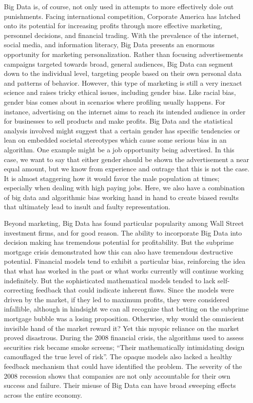 \documentclass[sigconf]{acmart}
\begin{document}
Big Data is, of course, not only used in attempts to more effectively dole out punishments. Facing international competition, Corporate America has latched onto its potential for increasing profits through more effective marketing, personnel decisions, and financial trading. With the prevalence of the internet, social media, and information literacy, Big Data presents an enormous opportunity for marketing personalization. Rather than focusing advertisements campaigns targeted towards broad, general audiences, Big Data can segment down to the individual level, targeting people based on their own personal data and patterns of behavior. However, this type of marketing is still a very inexact science and raises tricky ethical issues, including gender bias. Like racial bias, gender bias comes about in scenarios where profiling usually happens. For instance, advertising on the internet aims to reach its intended audience in order for businesses to sell products and make profits. Big Data and the statistical analysis involved might suggest that a certain gender has specific tendencies or lean on embedded societal stereotypes which cause some serious bias in an algorithm. One example might be a job opportunity being advertised. In this case, we want to say that either gender should be shown the advertisement a near equal amount, but we know from experience and outrage that this is not the case. It is almost staggering how it would favor the male population at times; especially when dealing with high paying jobs. Here, we also have a combination of big data and algorithmic bias working hand in hand to create biased results that ultimately lead to insult and faulty representation\cite{Brown2017}.

	Beyond marketing, Big Data has found particular popularity among Wall Street investment firms, and for good reason. The ability to incorporate Big Data into decision making has tremendous potential for profitability. But the subprime mortgage crisis demonstrated how this can also have tremendous destructive potential. Financial models tend to exhibit a particular bias, reinforcing the idea that what has worked in the past or what works currently will continue working indefinitely. But the sophisticated mathematical models tended to lack self-correcting feedback that could indicate inherent flaws. Since the models were driven by the market, if they led to maximum profits, they were considered infallible, although in hindsight we can all recognize that betting on the subprime mortgage bubble was a losing proposition. Otherwise, why would the omniscient invisible hand of the market reward it? Yet this myopic reliance on the market proved disastrous. During the 2008 financial crisis, the algorithms used to assess securities risk became smoke screens; ``Their mathematically intimidating design camouflaged the true level of risk''\cite{Wharton2016}. The opaque models also lacked a healthy feedback mechanism that could have identified the problem\cite{Wharton2016}. The severity of the 2008 recession shows that companies are not only accountable for their own success and failure. Their misuse of Big Data can have broad sweeping effects across the entire economy.
\end{document}
